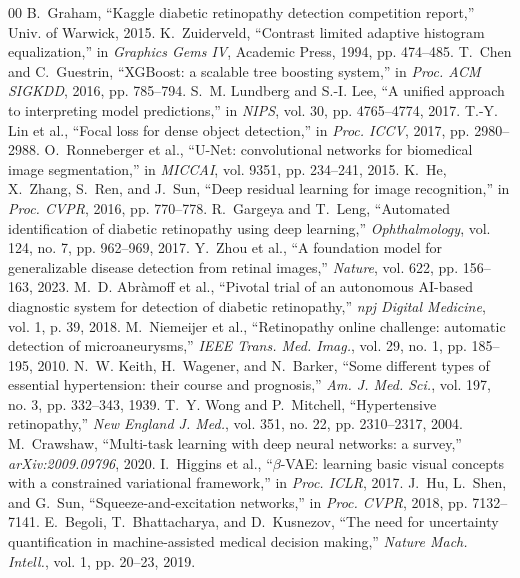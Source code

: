 \documentclass[conference]{IEEEtran}
\begin{document}
\begin{thebibliography}{00}
 B.~Graham, ``Kaggle diabetic retinopathy detection competition report,'' Univ. of Warwick, 2015.
 K.~Zuiderveld, ``Contrast limited adaptive histogram equalization,'' in \textit{Graphics Gems IV}, Academic Press, 1994, pp. 474--485.
 T.~Chen and C.~Guestrin, ``XGBoost: a scalable tree boosting system,'' in \textit{Proc. ACM SIGKDD}, 2016, pp. 785--794.
 S.~M. Lundberg and S.-I. Lee, ``A unified approach to interpreting model predictions,'' in \textit{NIPS}, vol. 30, pp. 4765--4774, 2017.
 T.-Y. Lin et al., ``Focal loss for dense object detection,'' in \textit{Proc. ICCV}, 2017, pp. 2980--2988.
 O.~Ronneberger et al., ``U-Net: convolutional networks for biomedical image segmentation,'' in \textit{MICCAI}, vol. 9351, pp. 234--241, 2015.
 K.~He, X.~Zhang, S.~Ren, and J.~Sun, ``Deep residual learning for image recognition,'' in \textit{Proc. CVPR}, 2016, pp. 770--778.
 R.~Gargeya and T.~Leng, ``Automated identification of diabetic retinopathy using deep learning,'' \textit{Ophthalmology}, vol. 124, no. 7, pp. 962--969, 2017.
 Y.~Zhou et al., ``A foundation model for generalizable disease detection from retinal images,'' \textit{Nature}, vol. 622, pp. 156--163, 2023.
 M.~D. Abr{\`a}moff et al., ``Pivotal trial of an autonomous AI-based diagnostic system for detection of diabetic retinopathy,'' \textit{npj Digital Medicine}, vol. 1, p. 39, 2018.
 M.~Niemeijer et al., ``Retinopathy online challenge: automatic detection of microaneurysms,'' \textit{IEEE Trans. Med. Imag.}, vol. 29, no. 1, pp. 185--195, 2010.
 N.~W. Keith, H.~Wagener, and N.~Barker, ``Some different types of essential hypertension: their course and prognosis,'' \textit{Am. J. Med. Sci.}, vol. 197, no. 3, pp. 332--343, 1939.
 T.~Y. Wong and P.~Mitchell, ``Hypertensive retinopathy,'' \textit{New England J. Med.}, vol. 351, no. 22, pp. 2310--2317, 2004.
 M.~Crawshaw, ``Multi-task learning with deep neural networks: a survey,'' \textit{arXiv:2009.09796}, 2020.
 I.~Higgins et al., ``$\beta$-VAE: learning basic visual concepts with a constrained variational framework,'' in \textit{Proc. ICLR}, 2017.
 J.~Hu, L.~Shen, and G.~Sun, ``Squeeze-and-excitation networks,'' in \textit{Proc. CVPR}, 2018, pp. 7132--7141.
 E.~Begoli, T.~Bhattacharya, and D.~Kusnezov, ``The need for uncertainty quantification in machine-assisted medical decision making,'' \textit{Nature Mach. Intell.}, vol. 1, pp. 20--23, 2019.

\end{thebibliography}
\end{document}
